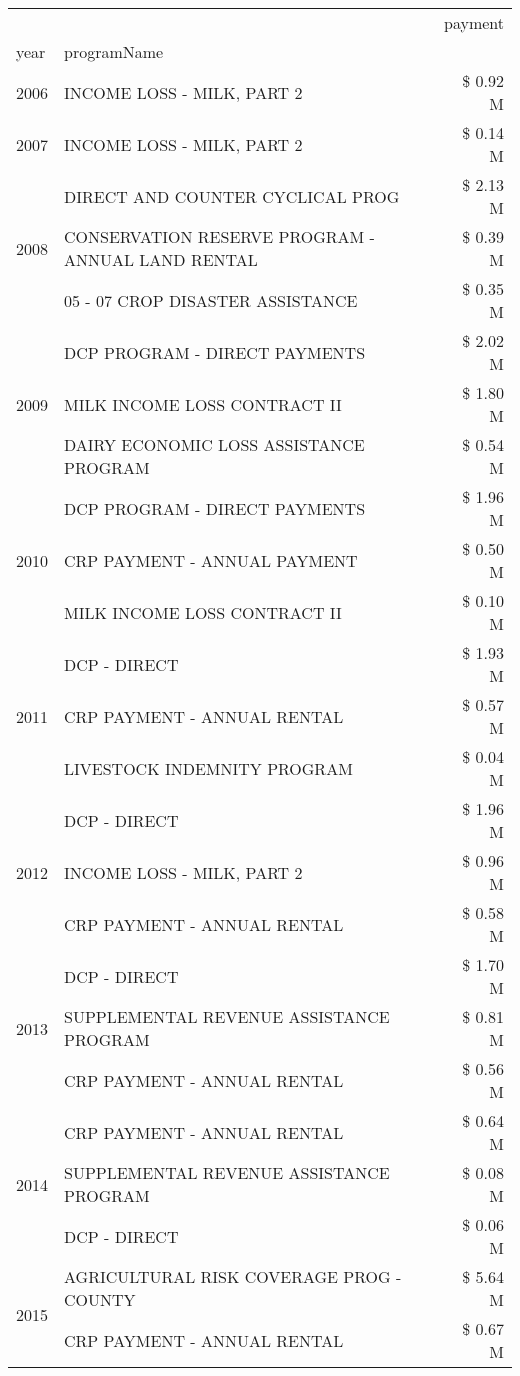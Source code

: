 \begin{tabular}{llr}
\toprule
 &  & payment \\
year & programName &  \\
\midrule
2006 & INCOME LOSS - MILK, PART 2 & \$ 0.92 M \\
\cline{1-3}
2007 & INCOME LOSS - MILK, PART 2 & \$ 0.14 M \\
\cline{1-3}
\multirow[t]{3}{*}{2008} & DIRECT AND COUNTER CYCLICAL PROG & \$ 2.13 M \\
 & CONSERVATION RESERVE PROGRAM - ANNUAL LAND RENTAL & \$ 0.39 M \\
 & 05 - 07 CROP DISASTER ASSISTANCE & \$ 0.35 M \\
\cline{1-3}
\multirow[t]{3}{*}{2009} & DCP PROGRAM - DIRECT PAYMENTS & \$ 2.02 M \\
 & MILK INCOME LOSS CONTRACT II & \$ 1.80 M \\
 & DAIRY ECONOMIC LOSS ASSISTANCE PROGRAM & \$ 0.54 M \\
\cline{1-3}
\multirow[t]{3}{*}{2010} & DCP PROGRAM - DIRECT PAYMENTS & \$ 1.96 M \\
 & CRP PAYMENT - ANNUAL PAYMENT & \$ 0.50 M \\
 & MILK INCOME LOSS CONTRACT II & \$ 0.10 M \\
\cline{1-3}
\multirow[t]{3}{*}{2011} & DCP - DIRECT & \$ 1.93 M \\
 & CRP PAYMENT - ANNUAL RENTAL & \$ 0.57 M \\
 & LIVESTOCK INDEMNITY PROGRAM & \$ 0.04 M \\
\cline{1-3}
\multirow[t]{3}{*}{2012} & DCP - DIRECT & \$ 1.96 M \\
 & INCOME LOSS - MILK, PART 2 & \$ 0.96 M \\
 & CRP PAYMENT - ANNUAL RENTAL & \$ 0.58 M \\
\cline{1-3}
\multirow[t]{3}{*}{2013} & DCP - DIRECT & \$ 1.70 M \\
 & SUPPLEMENTAL REVENUE ASSISTANCE PROGRAM & \$ 0.81 M \\
 & CRP PAYMENT - ANNUAL RENTAL & \$ 0.56 M \\
\cline{1-3}
\multirow[t]{3}{*}{2014} & CRP PAYMENT - ANNUAL RENTAL & \$ 0.64 M \\
 & SUPPLEMENTAL REVENUE ASSISTANCE PROGRAM & \$ 0.08 M \\
 & DCP - DIRECT & \$ 0.06 M \\
\cline{1-3}
\multirow[t]{3}{*}{2015} & AGRICULTURAL RISK COVERAGE PROG - COUNTY & \$ 5.64 M \\
 & CRP PAYMENT - ANNUAL RENTAL & \$ 0.67 M \\

\end{tabular}
